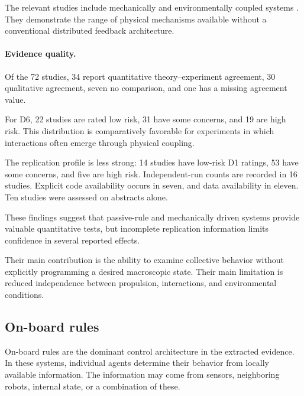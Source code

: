 The relevant studies include mechanically
and environmentally coupled systems
\cite{Zhou2021synchronizedswimmin,Zion2024amechanicalorigin,Bo2026threephasesofodd,Hu2026phototunablenonreci,Yang2025electronicfreepart,Newbolt2024flowinteractionsle,Vantomme2021coupledliquidcryst,Boudet2025effectsofboundarie,Das2025roleofkinematicco,Warmington2026adiscontinuouslyco,B2023adiscontinuouslyco,Xia2024biomimeticsynchroni,Miyashita2007selfassembleofwat,Mayya2019nonuniformrobotde,Zhang2024proteinfoldinginsp,Miyashita2008howmorphologyaffec,Ma2026crosslinkcollectiv,Li2013asymmetricgearrect,Leech2026spincoupledhydrody}.
They demonstrate the range of physical mechanisms
available without a conventional distributed
feedback architecture.

\paragraph*{Evidence quality.}

Of the 72 studies, 34 report quantitative
theory--experiment agreement, 30 qualitative
agreement, seven no comparison, and one has
a missing agreement value.

For D6, 22 studies are rated low risk,
31 have some concerns, and 19 are high risk.
This distribution is comparatively favorable
for experiments in which interactions often
emerge through physical coupling.

The replication profile is less strong:
14 studies have low-risk D1 ratings,
53 have some concerns, and five are high risk.
Independent-run counts are recorded in
16 studies. Explicit code availability
occurs in seven, and data availability
in eleven. Ten studies were assessed
on abstracts alone.

These findings suggest that passive-rule
and mechanically driven systems provide
valuable quantitative tests, but incomplete
replication information limits confidence
in several reported effects.

Their main contribution is the ability
to examine collective behavior without
explicitly programming a desired
macroscopic state. Their main limitation
is reduced independence between
propulsion, interactions, and
environmental conditions.

\subsection{On-board rules}
\label{sec:control-onboard}

On-board rules are the dominant control architecture
in the extracted evidence. In these systems,
individual agents determine their behavior from
locally available information. The information
may come from sensors, neighboring robots,
internal state, or a combination of these.

